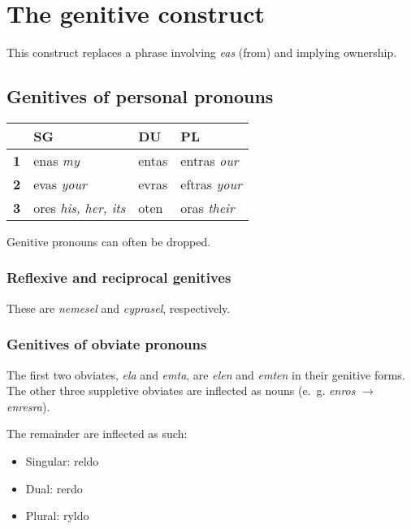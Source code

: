 \documentclass{book}
\begin{document}
\section{The genitive construct}

This construct replaces a phrase involving \emph{eas} (from) and implying ownership.

\subsection{Genitives of personal pronouns}

\begin{center}
  \begin{tabular}{|r|l|l|l|}
    \hline
    & \textbf{SG} & \textbf{DU} & \textbf{PL} \\ \hline
    \textbf{1} & enas \emph{my} & entas & entras \emph{our} \\ \hline
    \textbf{2} & evas \emph{your} & evras & eftras \emph{your} \\ \hline
    \textbf{3} & ores \emph{his, her, its} & oten & oras \emph{their} \\ \hline
  \end{tabular}
\end{center}

Genitive pronouns can often be dropped.

\subsubsection{Reflexive and reciprocal genitives}

These are \emph{nemesel} and \emph{cyprasel}, respectively.

\subsubsection{Genitives of obviate pronouns}

The first two obviates, \emph{ela} and \emph{emta}, are \emph{elen} and \emph{emten} in their genitive forms.  The other three suppletive obviates are inflected as nouns (e.~g. \emph{enros} $\rightarrow$ \emph{enresra}).

The remainder are inflected as such:

\begin{itemize}
	\item Singular: reldo
	\item Dual: rerdo
	\item Plural: ryldo
\end{itemize}
\end{document}
